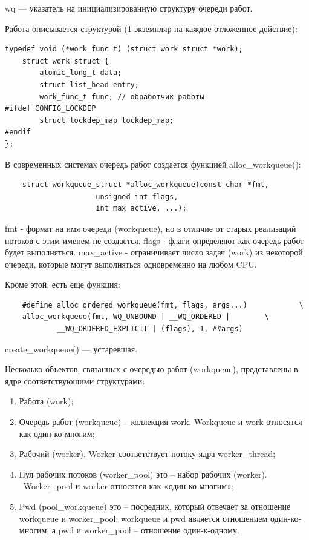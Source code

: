 wq --- указатель на инициализированную структуру очереди работ.

Работа описывается структурой (1 экземпляр на каждое отложенное действие):

\begin{lstlisting}
typedef void (*work_func_t) (struct work_struct *work);
	struct work_struct {
        atomic_long_t data;
        struct list_head entry;
        work_func_t func; // обработчик работы
#ifdef CONFIG_LOCKDEP
        struct lockdep_map lockdep_map;
#endif
};
\end{lstlisting}

В современных системах очередь работ создается функцией alloc\_workqueue():

\begin{lstlisting}
	struct workqueue_struct *alloc_workqueue(const char *fmt,
					 unsigned int flags,
					 int max_active, ...);
\end{lstlisting}

fmt - формат на имя очереди (workqueue), но в отличие от старых реализаций потоков с этим именем не создается. flags - флаги определяют как очередь работ будет выполняться. max\_active - ограничивает число задач (work) из некоторой очереди, которые могут выполняться одновременно на любом CPU.

Кроме этой, есть еще функция:
\begin{lstlisting}
	#define alloc_ordered_workqueue(fmt, flags, args...)			\
	alloc_workqueue(fmt, WQ_UNBOUND | __WQ_ORDERED |		\
			__WQ_ORDERED_EXPLICIT | (flags), 1, ##args)
\end{lstlisting}

create\_workqueue() --- устаревшая.

Несколько объектов, связанных с очередью работ (workqueue), представлены в ядре соответствующими структурами:
\begin{enumerate}
	\item Работа (work);
	\item Очередь работ (workqueue) – коллекция work. Workqueue и work относятся как один-ко-многим;
	\item Рабочий (worker). Worker соответствует потоку ядра worker\_thread;
	\item Пул рабочих потоков (worker\_pool) это – набор рабочих (worker). \\\ Worker\_pool и worker относятся как «один ко многим»;
	\item Pwd (pool\_workqueue) это – посредник, который отвечает за отношение workqueue и worker\_pool: workqueue и pwd является отношением один-ко-многим, а pwd и worker\_pool – отношение один-к-одному.
\end{enumerate}


